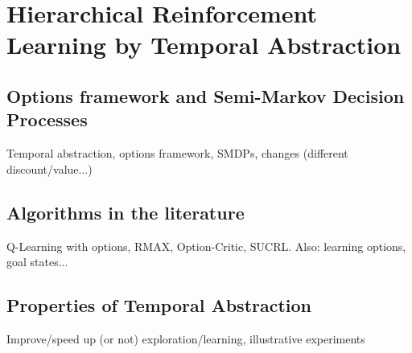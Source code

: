 
\chapter{Hierarchical Reinforcement Learning by Temporal Abstraction} %

\label{Chapter3}



\section{Options framework and Semi-Markov Decision Processes}

Temporal abstraction, options framework, SMDPs, changes (different discount/value...)

\section{Algorithms in the literature}

Q-Learning with options, RMAX, Option-Critic, SUCRL. Also: learning options, goal states...

\section{Properties of Temporal Abstraction}

Improve/speed up (or not) exploration/learning, illustrative experiments
